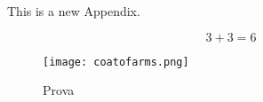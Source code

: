 
This is a new Appendix.

\begin{equation}
3+3 = 6
\end{equation}

\begin{figure}[htbp]
\begin{center}
\texttt{[image: coatofarms.png]}
\caption{Prova}
\end{center}
\end{figure}